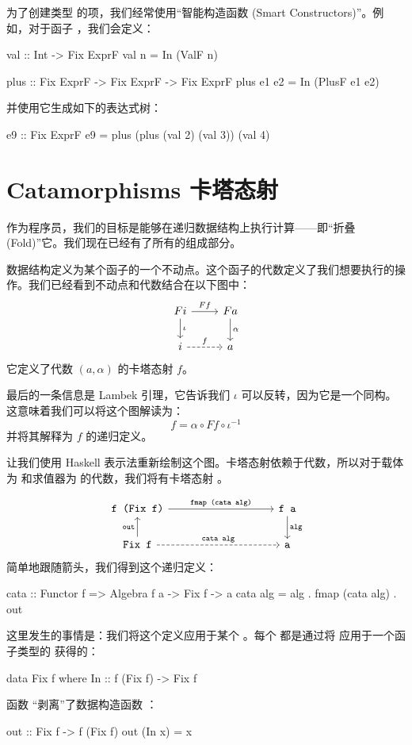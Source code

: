 \documentclass[DaoFP]{subfiles}
\begin{document}
 为了创建类型  的项，我们经常使用“智能构造函数 (Smart Constructors)”。例如，对于函子 ，我们会定义：
 \begin{haskell}
  val :: Int -> Fix ExprF
  val n = In (ValF n)

  plus :: Fix ExprF -> Fix ExprF -> Fix ExprF
  plus e1 e2 = In (PlusF e1 e2)
 \end{haskell}
 并使用它生成如下的表达式树：
 \begin{haskell}
  e9 :: Fix ExprF
  e9 = plus (plus (val 2) (val 3)) (val 4)
 \end{haskell}

 \section{Catamorphisms 卡塔态射}

 作为程序员，我们的目标是能够在递归数据结构上执行计算——即“折叠 (Fold)”它。我们现在已经有了所有的组成部分。

 数据结构定义为某个函子的一个不动点。这个函子的代数定义了我们想要执行的操作。我们已经看到不动点和代数结合在以下图中：
 \[
  \begin{tikzcd}
   F i
   \arrow[r, "F f"]
   \arrow[d, "\iota"]
   & F a
   \arrow[d, "\alpha"]
   \\
   i
   \arrow[r, dashed, "f"]
   & a
  \end{tikzcd}
 \]
 它定义了代数 $(a, \alpha)$ 的卡塔态射 $f$。

 最后的一条信息是 Lambek 引理，它告诉我们 $\iota$ 可以反转，因为它是一个同构。这意味着我们可以将这个图解读为：
 \[ f = \alpha \circ F f \circ \iota^{-1} \]
 并将其解释为 $f$ 的递归定义。

 让我们使用 Haskell 表示法重新绘制这个图。卡塔态射依赖于代数，所以对于载体为  和求值器为  的代数，我们将有卡塔态射 。

 \[
  \begin{tikzcd}
   \hask{f (Fix f)}
   \arrow[rrrr, "\hask{fmap (cata alg)}"]
   &&&& \hask{f a}
   \arrow[d, "\hask{alg}"]
   \\
   \hask{Fix f}
   \arrow[u, "\hask{out}"]
   \arrow[rrrr, dashed, "\hask{cata alg}"]
   &&&& \hask{a}
  \end{tikzcd}
 \]
 简单地跟随箭头，我们得到这个递归定义：
 \begin{haskell}
  cata :: Functor f => Algebra f a -> Fix f -> a
  cata alg = alg . fmap (cata alg) . out
 \end{haskell}

 这里发生的事情是：我们将这个定义应用于某个 。每个  都是通过将  应用于一个函子类型的  获得的：
 \begin{haskell}
  data Fix f where
  In :: f (Fix f) -> Fix f
 \end{haskell}
 函数  “剥离”了数据构造函数 ：
 \begin{haskell}
  out :: Fix f -> f (Fix f)
  out (In x) = x
 \end{haskell}
\end{document}
